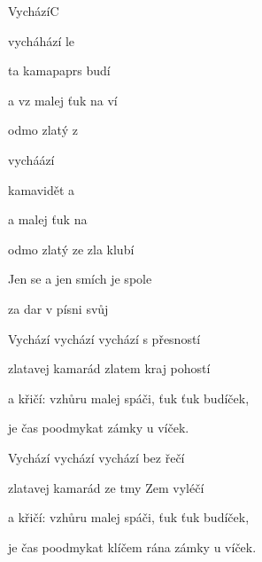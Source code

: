\setcounter{page}{119}
\begin{song}{Vychází}{C}{}
\begin{SBVerse}
 vycháhází  le

ta kamapaprs budí 

a  vz malej   ťuk na ví

odmo zlatý  z 

 vycháází  

 kamavidět  a 

a   malej   ťuk na 

odmo zlatý  ze zla klubí
\end{SBVerse}
\begin{SBChorus}
Jen se a jen  smích je  spole

  za dar  v písni  svůj 
\end{SBChorus}
\begin{SBVerse}
Vychází vychází vychází s přesností

zlatavej kamarád zlatem kraj pohostí

a křičí: vzhůru malej spáči, ťuk ťuk budíček,

je čas poodmykat zámky u víček.

Vychází vychází vychází bez řečí

zlatavej kamarád ze tmy Zem vyléčí

a křičí: vzhůru malej spáči, ťuk ťuk budíček,

je čas poodmykat klíčem rána zámky u víček.
\end{SBVerse}
\end{song}
